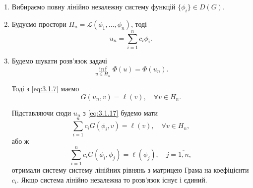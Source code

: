 \begin{enumerate}
    \item Вибираємо повну лінійно незалежну систему функцій $\{\phi_i\} \in D(G)$.
    
    \item Будуємо простори $H_n = \mathcal{L}(\phi_1,\ldots,\phi_n)$, тоді 
    \begin{equation}
        \label{eq:3.1.17}
        u_n = \sum_{i = 1}^n c_i \phi_i.
    \end{equation}
    
    \item Будемо шукати розв'язок задачі
    \begin{equation}
        \label{eq:3.1.18}
        \inf_{u \in H_n} \Phi(u) = \Phi(u_n).
    \end{equation}
    
    Тоді з \eqref{eq:3.1.7} маємо
    \begin{equation}
        \label{eq:3.1.19}
        G(u_n,v)=\ell(v), \quad \forall v \in H_n.
    \end{equation}
    
    Підставляючи сюди $u_n$ з \eqref{eq:3.1.17} будемо мати
    \begin{equation}
        \label{eq:3.1.20}
        \sum_{i = 1}^n c_i G(\phi_i, v) = \ell(v), \quad \forall v \in H_n,
    \end{equation}
    або ж
    \begin{equation}
        \label{eq:3.1.21}
        \sum_{i = 1}^n c_i G(\phi_i, \phi_j) = \ell(\phi_j), \quad j = \overline{1,n},
    \end{equation}
    отримали систему систему лінійних рівнянь з матрицею Грама на коефіцієнти $c_i$. Якщо система лінійно незалежна то розв'язок існує і єдиний.
\end{enumerate}
